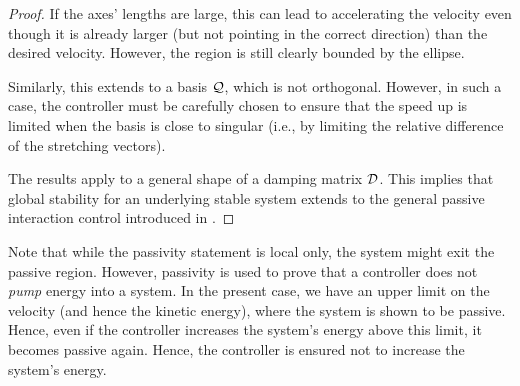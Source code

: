 \begin{proof}
If the axes' lengths are large, this can lead to accelerating the velocity even though it is already larger (but not pointing in the correct direction) than the desired velocity. However, the region is still clearly bounded by the ellipse.

Similarly, this extends to a basis $\mathcal{Q}$, which is not orthogonal. However, in such a case, the controller must be carefully chosen to ensure that the speed up is limited when the basis is close to singular (i.e., by limiting the relative difference of the stretching vectors).

The results apply to a general shape of a damping matrix $\mathcal{D}$. This implies that global stability for an underlying stable system extends to the general passive interaction control introduced in \cite{kronander2015passive}.
\end{proof}

Note that while the passivity statement is local only, the system might exit the passive region. However, passivity is used to prove that a controller does not \textit{pump} energy into a system. In the present case, we have an upper limit on the velocity (and hence the kinetic energy), where the system is shown to be passive. Hence, even if the controller increases the system's energy above this limit, it becomes passive again. Hence, the controller is ensured not to increase the system's energy.



